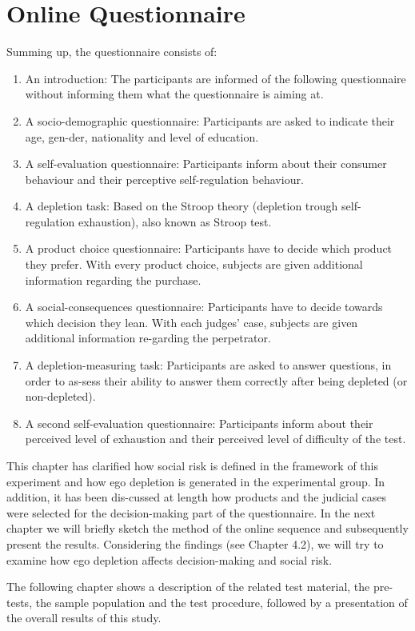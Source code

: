 \section{Online Questionnaire}
Summing up, the questionnaire consists of:
\begin{enumerate}
\item An introduction: The participants are informed of the following questionnaire without informing them what the questionnaire is aiming at. 
\item A socio-demographic questionnaire: Participants are asked to indicate their age, gen-der, nationality and level of education.
\item A self-evaluation questionnaire: Participants inform about their consumer behaviour and their perceptive self-regulation behaviour.
\item A depletion task: Based on the Stroop theory (depletion trough self-regulation exhaustion), also known as Stroop test.  
\item A product choice questionnaire: Participants have to decide which product they prefer. With every product choice, subjects are given additional information regarding the purchase.
\item A social-consequences questionnaire: Participants have to decide towards which decision they lean. With each judges’ case, subjects are given additional information re-garding the perpetrator.
\item A depletion-measuring task: Participants are asked to answer questions, in order to as-sess their ability to answer them correctly after being depleted (or non-depleted).
\item A second self-evaluation questionnaire: Participants inform about their perceived level of exhaustion and their perceived level of difficulty of the test.
\end{enumerate}

This chapter has clarified how social risk is defined in the framework of this experiment and how ego depletion is generated in the experimental group.  In addition, it has been dis-cussed at length how products and the judicial cases were selected for the decision-making part of the questionnaire. In the next chapter we will briefly sketch the method of the online sequence and subsequently present the results. Considering the findings (see Chapter 4.2), we will try to examine how ego depletion affects decision-making and social risk. \par
The following chapter shows a description of the related test material, the pre-tests, the sample population and the test procedure, followed by a presentation of the overall results of this study.\par

